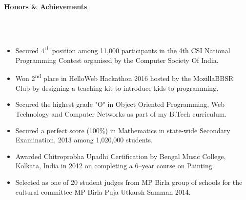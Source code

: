 \documentclass[a4paper,10pt]{article}
\newcommand{\lsep}{-0.5cm}
\newcommand{\resheading}[1]{{\large \colorbox{mygrey}{\begin{minipage}{0.99\textwidth}{\textbf{#1 \vphantom{p\^{E}}}}\end{minipage}}}}
\begin{document}
\resheading{\textbf{Honors \& Achievements}}\\[\lsep]\\[-0.2cm]
\begin{itemize}

\item {Secured 4\textsuperscript{th} position among 11,000 participants in the 4th CSI National Programming Contest organised by the Computer Society Of India.}
\item {Won 2\textsuperscript{nd} place in HelloWeb Hackathon 2016 hosted by the MozillaBBSR Club by designing a teaching kit to introduce kids to programming.}
\item {Secured the highest grade "O" in Object Oriented Programming, Web Technology and Computer Networks as part of my B.Tech curriculum. }
\item {Secured a perfect score (100\%) in Mathematics in state-wide Secondary Examination, 2013 among 1,020,000 students.}
\item {Awarded Chitroprobha Upadhi Certification by Bengal Music College, Kolkata, India in 2012 on completing a 6--year course on Painting.}
\item {Selected as one of 20 student judges from MP Birla group of schools for the cultural committee MP Birla Puja Utkarsh Samman 2014.}
\end{itemize}
\end{document}
